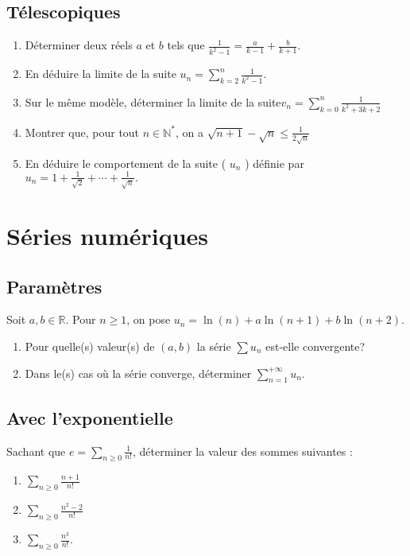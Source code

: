   \subsection{Télescopiques}
  \begin{enumerate}[label = \alph*)]
    \item Déterminer deux réels $a$ et $b$ tels que $\displaystyle
\frac{1}{k^2-1}=\frac{a}{k-1}+\frac{b}{k+1} .
$

    \item En déduire la limite de la suite $\displaystyle
u_n=\sum_{k=2}^n \frac{1}{k^2-1} .
$

    \item Sur le même modèle, déterminer la limite de la suite$
v_n=\sum_{k=0}^n \frac{1}{k^2+3 k+2}
$


    \item Montrer que, pour tout $n \in \mathbb{N}^*$, on a $
\sqrt{n+1}-\sqrt{n} \leq \frac{1}{2 \sqrt{n}}
$


    \item En déduire le comportement de la suite ( $u_n$ ) définie par $
u_n=1+\frac{1}{\sqrt{2}}+\cdots+\frac{1}{\sqrt{n}} .
$
  \end{enumerate}


\vspace{1em}

\section*{Séries numériques}
\subsection{Paramètres}
Soit $a, b \in \mathbb{R}$. Pour $n \geq 1$, on pose $u_n=\ln (n)+a \ln (n+1)+b \ln (n+2)$.
\begin{enumerate}[label = \alph*)]
  \item Pour quelle(s) valeur(s) de $(a, b)$ la série $\sum u_n$ est-elle convergente?
  \item Dans le(s) cas où la série converge, déterminer $\sum_{n=1}^{+\infty} u_n$.
\end{enumerate}

\vspace{1em}

\subsection{Avec l'exponentielle}
Sachant que $e=\sum_{n \geq 0} \frac{1}{n!}$, déterminer la valeur des sommes suivantes :
\begin{enumerate}[label = \alph*)]
  \item $\sum_{n \geq 0} \frac{n+1}{n!}$
  \item $\sum_{n \geq 0} \frac{n^2-2}{n!}$
  \item $\sum_{n \geq 0} \frac{n^3}{n!}$.
\end{enumerate}


